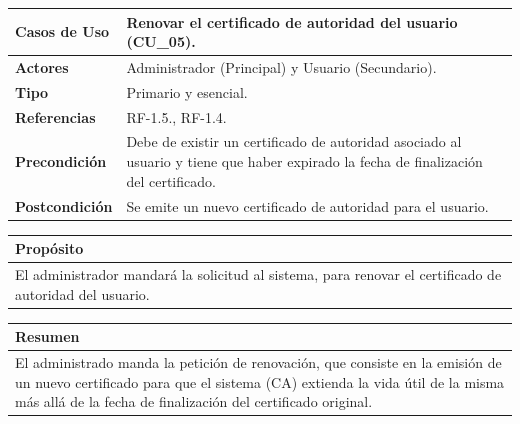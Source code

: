 \begin{itemize}
    \begin{table}[h!]
        \centering
        \begin{tabular}{|l|p{}|}
            \hline
            \textbf{Casos de Uso}   &   Renovar el certificado de autoridad del usuario (CU\_05). \\
            \hline 
            \textbf{Actores}        &   Administrador (Principal) y Usuario (Secundario). \\ 
            \hline 
            \textbf{Tipo}           &   Primario y esencial. \\ 
            \hline
            \textbf{Referencias}    &   RF-1.5., RF-1.4.\\ 
            \hline
            \textbf{Precondición}   &  Debe de existir un certificado de autoridad asociado al usuario y tiene que 
            haber expirado la fecha de finalización del certificado. \\ 
            \hline
            \textbf{Postcondición}  &  Se emite un nuevo certificado de autoridad para el usuario. \\ 
            \hline
        \end{tabular}
        
        \vspace{5mm}
        
        \begin{tabular}{|p{\textwidth}|}
            \hline
            \rowcolor{SeaGreen} \textbf{Propósito} \\
            \hline
            \multicolumn{1}{|p{12cm}|}{El administrador mandará la solicitud al sistema, para renovar el 
            certificado de autoridad del usuario.} \\ [0.5ex]
            \hline
        \end{tabular}
        
        \vspace{5mm}
        
        \begin{tabular}{|p{\textwidth}|}
            \hline
            \rowcolor{SeaGreen} \textbf{Resumen} \\
            \hline
            \multicolumn{1}{|p{12cm}|}{El administrado manda la petición de renovación, que consiste en la emisión de un 
            nuevo certificado para que el sistema (CA) extienda la vida útil de la misma más allá de la fecha de 
            finalización del certificado original.} \\ [0.5ex]
            \hline
        \end{tabular}
        

\end{table}
\end{itemize}
